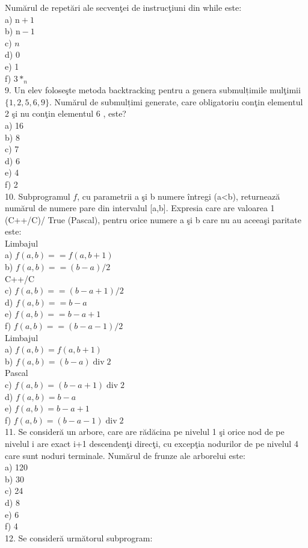 \documentclass[10pt]{article}
\begin{document}
Numărul de repetări ale secvenţei de instrucţiuni din while este:\\
a) $\mathrm{n}+1$\\
b) $\mathrm{n}-1$\\
c) $n$\\
d) 0\\
e) 1\\
f) $3 *_{n}$\\
9. Un elev foloseşte metoda backtracking pentru a genera submulțimile mulţimii $\{1,2,5,6,9\}$. Numărul de submulțimi generate, care obligatoriu conţin elementul 2 şi nu conţin elementul 6 , este?\\
a) 16\\
b) 8\\
c) 7\\
d) 6\\
e) 4\\
f) 2\\
10. Subprogramul $f$, cu parametrii a şi b numere întregi (a<b), returnează numărul de numere pare din intervalul [a,b]. Expresia care are valoarea 1 (C++/C)/ True (Pascal), pentru orice numere a şi b care nu au aceeaşi paritate este:\\
Limbajul\\
a) $f(a, b)==f(a, b+1)$\\
b) $f(a, b)==(b-a) / 2$\\
C++/C\\
c) $f(a, b)==(b-a+1) / 2$\\
d) $f(a, b)==b-a$\\
e) $f(a, b)==b-a+1$\\
f) $f(a, b)==(b-a-1) / 2$\\
Limbajul\\
a) $f(a, b)=f(a, b+1)$\\
b) $f(a, b)=(b-a) \operatorname{div} 2$\\
Pascal\\
c) $f(a, b)=(b-a+1) \operatorname{div} 2$\\
d) $f(a, b)=b-a$\\
e) $f(a, b)=b-a+1$\\
f) $f(a, b)=(b-a-1) \operatorname{div} 2$\\
11. Se consideră un arbore, care are rădăcina pe nivelul 1 şi orice nod de pe nivelul i are exact i+1 descendenţi direcţi, cu excepţia nodurilor de pe nivelul 4 care sunt noduri terminale. Numărul de frunze ale arborelui este:\\
a) 120\\
b) 30\\
c) 24\\
d) 8\\
e) 6\\
f) 4\\
12. Se consideră următorul subprogram:
\end{document}
